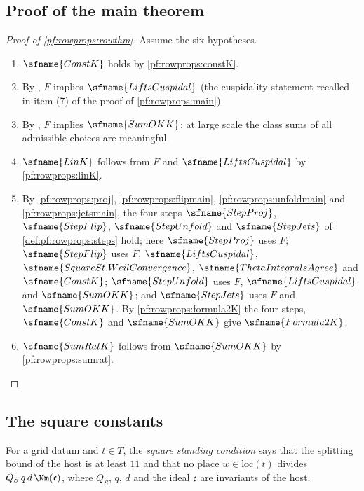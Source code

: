 \subsection{Proof of the main theorem}\label{sec:pf:rowprops:assembly}

\begin{proof}[Proof of \cref{pf:rowprops:rowthm}]
Assume the six hypotheses.
\begin{enumerate}[label=(\arabic*)]
\item $\sfname{ConstK}$ holds by \cref{pf:rowprops:constK}.
\item By , $F$ implies $\sfname{LiftsCuspidal}$ (the cuspidality
statement recalled in item (7) of the proof of \cref{pf:rowprops:main}).
\item By , $F$ implies $\sfname{SumOKK}$: at large scale the
class sums of all admissible choices are meaningful.
\item $\sfname{LinK}$ follows from $F$ and $\sfname{LiftsCuspidal}$ by \cref{pf:rowprops:linK}.
\item By \cref{pf:rowprops:proj}, \cref{pf:rowprops:flipmain}, \cref{pf:rowprops:unfoldmain} and \cref{pf:rowprops:jetsmain},
the four steps $\sfname{StepProj}$, $\sfname{StepFlip}$, $\sfname{StepUnfold}$ and $\sfname{StepJets}$ of
\cref{def:pf:rowprops:steps} hold; here $\sfname{StepProj}$ uses $F$; $\sfname{StepFlip}$ uses $F$, $\sfname{LiftsCuspidal}$,
$\sfname{SquareSt.WeilConvergence}$, $\sfname{ThetaIntegralsAgree}$ and $\sfname{ConstK}$; $\sfname{StepUnfold}$ uses $F$,
$\sfname{LiftsCuspidal}$ and $\sfname{SumOKK}$; and $\sfname{StepJets}$ uses $F$ and $\sfname{SumOKK}$. By
\cref{pf:rowprops:formula2K} the four steps, $\sfname{ConstK}$ and $\sfname{SumOKK}$ give $\sfname{Formula2K}$.
\item $\sfname{SumRatK}$ follows from $\sfname{SumOKK}$ by \cref{pf:rowprops:sumrat}.\qedhere
\end{enumerate}
\end{proof}

\subsection{The square constants}\label{sec:pf:rowprops:const}

\begin{definition}\label{def:pf:rowprops:standing}
For a grid datum and $t\in T$, the \emph{square standing condition} says that the splitting bound of the host is at
least $11$ and that no place $w\in\mathrm{loc}(t)$ divides $Q_S\,q\,d\,\Nm(\mathfrak c)$, where $Q_S$, $q$, $d$ and the
ideal $\mathfrak c$ are invariants of the host.
\end{definition}

